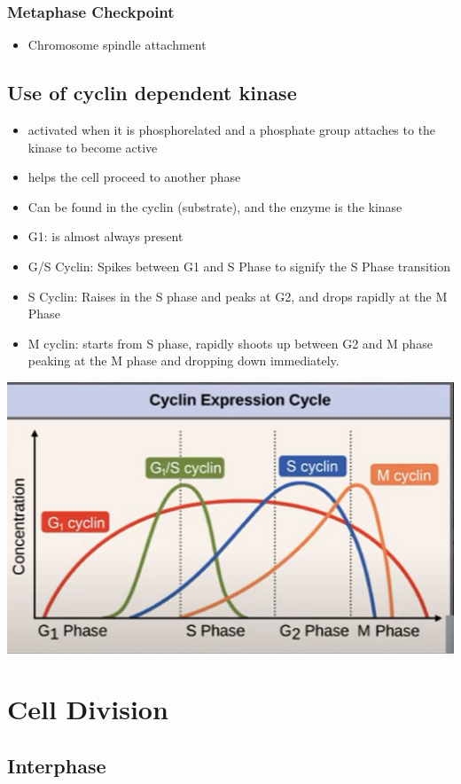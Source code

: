 \documentclass{article}
\begin{document}
\subsubsection*{Metaphase Checkpoint}
\begin{itemize}
    \item Chromosome spindle attachment
\end{itemize}
\subsection*{Use of cyclin dependent kinase}
\begin{itemize}
    \item activated when it is phosphorelated and a phosphate group attaches to the kinase to become  active
    \item helps the cell proceed to another phase
    \item Can be found in the cyclin (substrate), and the enzyme is the kinase
    \item G1: is almost always present
    \item G/S Cyclin: Spikes between G1 and S Phase to signify the S Phase transition
    \item S Cyclin: Raises in  the S phase and peaks at G2, and drops rapidly at the M Phase
    \item M cyclin: starts from S phase, rapidly shoots up between G2 and M phase peaking at the M phase and dropping down immediately.
\end{itemize}
\includegraphics*[scale=0.6]{cyclin.png}
\section*{Cell Division}
\subsection*{Interphase}
\end{document}
